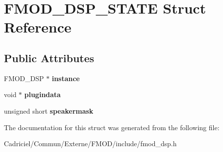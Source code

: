 \hypertarget{struct_f_m_o_d___d_s_p___s_t_a_t_e}{}\section{F\+M\+O\+D\+\_\+\+D\+S\+P\+\_\+\+S\+T\+A\+TE Struct Reference}
\label{struct_f_m_o_d___d_s_p___s_t_a_t_e}
\subsection*{Public Attributes}
\begin{DoxyCompactItemize}
\item 
F\+M\+O\+D\+\_\+\+D\+SP $\ast$ {\bfseries instance}\hypertarget{struct_f_m_o_d___d_s_p___s_t_a_t_e_a1756ea7b18fdd566e64c64de4151a39c}{}\label{struct_f_m_o_d___d_s_p___s_t_a_t_e_a1756ea7b18fdd566e64c64de4151a39c}

\item 
void $\ast$ {\bfseries plugindata}\hypertarget{struct_f_m_o_d___d_s_p___s_t_a_t_e_a94293193f1fd65ffc7d72de31e03932c}{}\label{struct_f_m_o_d___d_s_p___s_t_a_t_e_a94293193f1fd65ffc7d72de31e03932c}

\item 
unsigned short {\bfseries speakermask}\hypertarget{struct_f_m_o_d___d_s_p___s_t_a_t_e_a98c7cf116176d358e3d26193245f6e19}{}\label{struct_f_m_o_d___d_s_p___s_t_a_t_e_a98c7cf116176d358e3d26193245f6e19}

\end{DoxyCompactItemize}


The documentation for this struct was generated from the following file\+:\begin{DoxyCompactItemize}
\item 
Cadriciel/\+Commun/\+Externe/\+F\+M\+O\+D/include/fmod\+\_\+dsp.\+h\end{DoxyCompactItemize}
